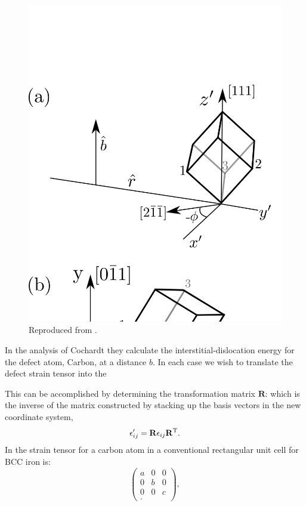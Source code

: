 \begin{figure}[!tbp]
\begin{center}
\includegraphics[scale=0.8]{./metallurgy/screwcoordinate.png}
\caption{\label{fig:interstitialcoords} Reproduced from \cite{cochardt55}.}
\end{center}
\end{figure}
%
In the analysis of Cochardt they calculate the interstitial-dislocation
energy for the defect atom, Carbon, at a distance $b$. In each case we
wish to translate the defect strain tensor into the

This can be accomplished by determining the transformation matrix $\mathbf{R}$:
which is the inverse of the matrix constructed by stacking up
the basis vectors in the new coordinate system,
%
\begin{equation}
\epsilon'_{ij} = \mathbf{R} \epsilon_{ij} \mathbf{R}^{\rm T}.
\end{equation}
%
In \cite{cochardt55} the strain tensor for a carbon atom in
a conventional rectangular unit cell for BCC iron is:
%
\begin{equation}
\left(
\begin{array}{ccc}
 a & 0 & 0 \\
 0 & b & 0 \\
 0 & 0 & c  \\.
\end{array}
\right),
\end{equation}
%

